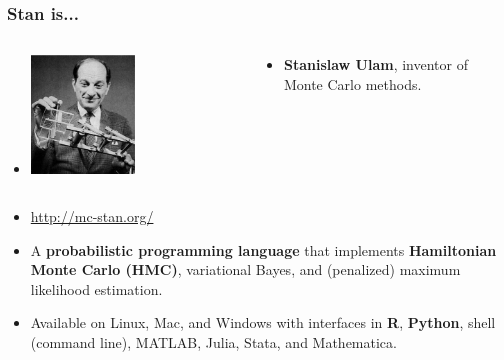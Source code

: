 \documentclass[xcolor=dvipsnames]{beamer}
\begin{document}
\begin{frame}
\frametitle{Stan is...}

\begin{columns}[c]
 \begin{column}[c]{0.5\textwidth}

\begin{itemize}
\item[] 
\begin{center}
\includegraphics[width=0.5\textwidth]{stan.jpg}
\end{center}
\end{itemize}
\end{column}

\begin{column}[c]{0.5\textwidth}
\begin{itemize}
\item[] \textbf{Stanislaw Ulam}, inventor of Monte Carlo methods.\\
\end{itemize}
\end{column}
\end{columns}

\vspace{0.2cm}

\begin{itemize}
\item[] \url{http://mc-stan.org/}

\vspace{0.2cm}

\item[] A \textbf{probabilistic programming language} that implements {\color{red}\textbf{Hamiltonian Monte Carlo (HMC)}}, variational Bayes, and (penalized) maximum likelihood estimation.\\

\vspace{0.2cm}

\item[] Available on Linux, Mac, and Windows with interfaces in \textbf{R}, \textbf{Python}, shell (command line), MATLAB, Julia, Stata, and Mathematica.

\end{itemize}
\end{frame}
\end{document}
